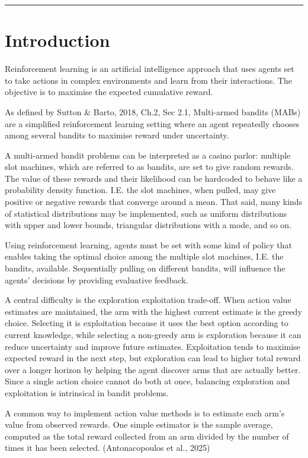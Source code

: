 \documentclass[11pt]{article}
\begin{document}
{\setlength\parindent{0mm} \color{ForestGreen} \rule{\linewidth}{0.5mm}} %

\section*{\LARGE Introduction}
Reinforcement learning is an artificial intelligence approach that uses agents set to take actions in complex environments and learn from their interactions. The objective is to maximise the expected cumulative reward.

As defined by Sutton \& Barto, 2018, Ch.2, Sec 2.1, Multi-armed bandits (MABs) are a simplified reinforcement learning setting where an agent repeatedly chooses among several bandits to maximise reward under uncertainty. 

A multi-armed bandit problems can be interpreted as a casino parlor: multiple slot machines, which are referred to as bandits, are set to give random rewards. The value of these rewards and their likelihood can be hardcoded to behave like a probability density function. I.E. the slot machines, when pulled, may give positive or negative rewards that converge around a mean. That said, many kinds of statistical distributions may be implemented, such as uniform distributions with upper and lower bounds, triangular distributions with a mode, and so on.

Using reinforcement learning, agents must be set with some kind of policy that enables taking the optimal choice among the multiple slot machines, I.E. the bandits, available. Sequentially pulling on different bandits, will influence the agents' decisions by providing evaluative feedback.

A central difficulty is the exploration exploitation trade-off. When action value estimates are maintained, the arm with the highest current estimate is the greedy choice. Selecting it is exploitation because it uses the best option according to current knowledge, while selecting a non-greedy arm is exploration because it can reduce uncertainty and improve future estimates. Exploitation tends to maximise expected reward in the next step, but exploration can lead to higher total reward over a longer horizon by helping the agent discover arms that are actually better. Since a single action choice cannot do both at once, balancing exploration and exploitation is intrinsical in bandit problems.

A common way to implement action value methods is to estimate each arm's value from observed rewards. One simple estimator is the sample average, computed as the total reward collected from an arm divided by the number of times it has been selected. (Antonacopoulos et al., 2025)
\end{document}

